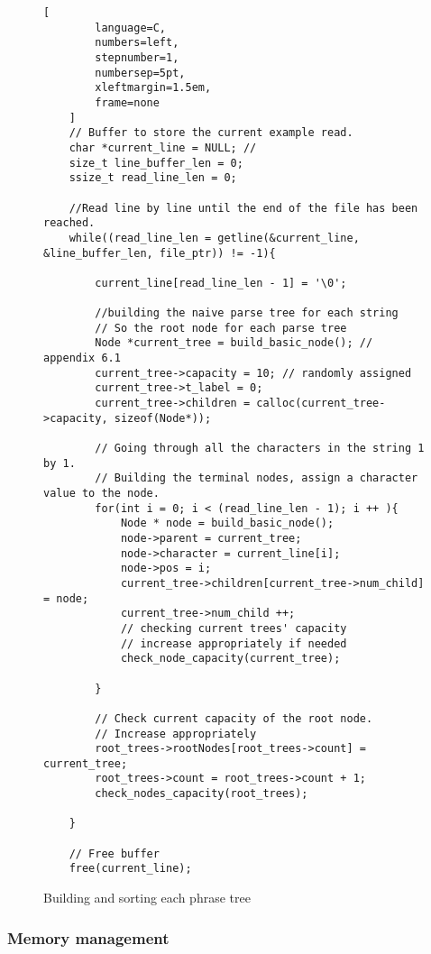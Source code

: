 \begin{figure}[h]
    \begin{lstlisting}[
        language=C,
        numbers=left,
        stepnumber=1,
        numbersep=5pt,
        xleftmargin=1.5em,
        frame=none
    ]
    // Buffer to store the current example read.
    char *current_line = NULL; // 
    size_t line_buffer_len = 0;
    ssize_t read_line_len = 0;
    
    //Read line by line until the end of the file has been reached.
    while((read_line_len = getline(&current_line, &line_buffer_len, file_ptr)) != -1){

        current_line[read_line_len - 1] = '\0';

        //building the naive parse tree for each string
        // So the root node for each parse tree
        Node *current_tree = build_basic_node(); // appendix 6.1
        current_tree->capacity = 10; // randomly assigned
        current_tree->t_label = 0;
        current_tree->children = calloc(current_tree->capacity, sizeof(Node*));

        // Going through all the characters in the string 1 by 1. 
        // Building the terminal nodes, assign a character value to the node.
        for(int i = 0; i < (read_line_len - 1); i ++ ){
            Node * node = build_basic_node();
            node->parent = current_tree;
            node->character = current_line[i];
            node->pos = i;
            current_tree->children[current_tree->num_child] = node;
            current_tree->num_child ++;
            // checking current trees' capacity
            // increase appropriately if needed
            check_node_capacity(current_tree);

        }

        // Check current capacity of the root node.
        // Increase appropriately
        root_trees->rootNodes[root_trees->count] = current_tree;
        root_trees->count = root_trees->count + 1;
        check_nodes_capacity(root_trees);

    }
    
    // Free buffer
    free(current_line);

\end{lstlisting}

\caption{Building and sorting each phrase tree}
\label{fig:buildeachParseTree}
\end{figure}

\subsubsection{Memory management}

